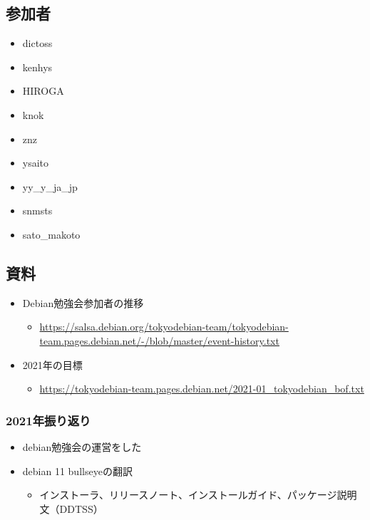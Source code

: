 \documentclass[mingoth,a4paper]{jsarticle}
\begin{document}


\subsection{参加者}

\begin{itemize}
  \item dictoss
  \item kenhys
  \item HIROGA
  \item knok
  \item znz
  \item ysaito
  \item yy\_y\_ja\_jp
  \item snmsts
  \item sato\_makoto
\end{itemize}

\subsection{資料}

\begin{itemize}
  \item Debian勉強会参加者の推移
    \begin{itemize}
    \item \url{https://salsa.debian.org/tokyodebian-team/tokyodebian-team.pages.debian.net/-/blob/master/event-history.txt}
    \end{itemize}
  \item 2021年の目標
    \begin{itemize}
    \item \url{https://tokyodebian-team.pages.debian.net/2021-01_tokyodebian_bof.txt}
    \end{itemize}
\end{itemize}

\subsubsection{2021年振り返り}


\begin{itemize}
  \item debian勉強会の運営をした
  \item debian 11 bullseyeの翻訳
  \begin{itemize}
    \item インストーラ、リリースノート、インストールガイド、パッケージ説明文（DDTSS）
  \end{itemize}
\end{itemize}
\end{document}
